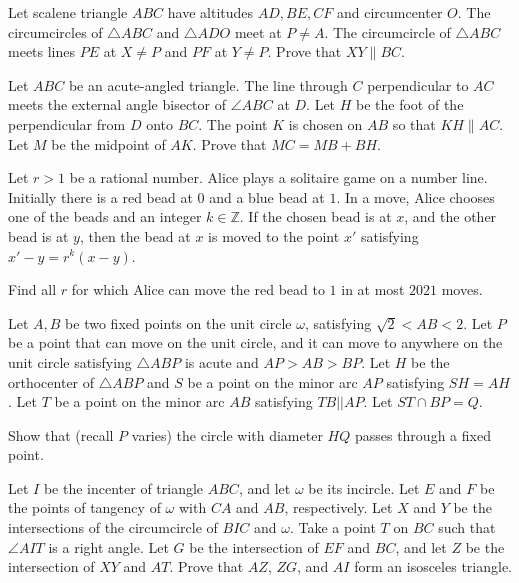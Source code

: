\documentclass[11pt]{scrartcl}
\begin{document}
\begin{problem}[9153191064326230951]
Let scalene triangle $ABC$ have altitudes $AD, BE, CF$ and circumcenter $O$. The circumcircles of $\triangle ABC$ and $\triangle ADO$ meet at $P \ne A$. The circumcircle of $\triangle ABC$ meets lines $PE$ at $X \ne P$ and $PF$ at $Y \ne P$. Prove that $XY \parallel BC$.
\end{problem}
\begin{problem}[5441518070935718077]
	Let $ABC$ be an acute-angled triangle. The line through $C$ perpendicular to $AC$ meets the external angle bisector of $\angle ABC$ at $D$. Let $H$ be the foot of the perpendicular from $D$ onto $BC$. The point $K$ is chosen on $AB$ so that $KH \parallel AC$. Let $M$ be the midpoint of $AK$. Prove that $MC = MB + BH$.
\end{problem}
\begin{problem}[8866273454792491736]
	Let $r>1$ be a rational number. Alice plays a solitaire game on a number line. Initially there is a red bead at $0$ and a blue bead at $1$. In a move, Alice chooses one of the beads and an integer $k \in \mathbb{Z}$. If the chosen bead is at $x$, and the other bead is at $y$, then the bead at $x$ is moved to the point $x'$ satisfying $x'-y=r^k(x-y)$.

Find all $r$ for which Alice can move the red bead to $1$ in at most $2021$ moves.
\end{problem}
\begin{problem}[308110166188097]
Let $A,B$ be two fixed points on the unit circle $\omega$, satisfying $\sqrt{2} < AB < 2$. Let $P$ be a point that can move on the unit circle, and it can move to anywhere on the unit circle satisfying $\triangle ABP$ is acute and $AP>AB>BP$. Let $H$ be the orthocenter of $\triangle ABP$ and $S$ be a point on the minor arc $AP$ satisfying $SH=AH$. Let $T$ be a point on the minor arc $AB$ satisfying $TB || AP$. Let $ST\cap BP = Q$.

Show that (recall $P$ varies) the circle with diameter $HQ$ passes through a fixed point.
\end{problem}
\begin{problem}[651490142085731]
	Let $I$ be the incenter of triangle $ABC$, and let $\omega$ be its incircle. Let $E$ and $F$ be the points of tangency of $\omega$ with $CA$ and $AB$, respectively. Let $X$ and $Y$ be the intersections of the circumcircle of $BIC$ and $\omega$. Take a point $T$ on $BC$ such that $\angle AIT$ is a right angle. Let $G$ be the intersection of $EF$ and $BC$, and let $Z$ be the intersection of $XY$ and $AT$. Prove that $AZ$, $ZG$, and $AI$ form an isosceles triangle.
\end{problem}
\end{document}

